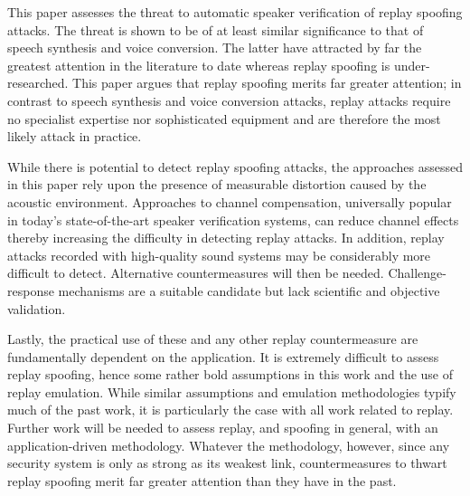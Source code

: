 
This paper assesses the threat to automatic speaker verification of replay spoofing attacks.  The threat is shown to be of at least similar significance to that of speech synthesis and voice conversion.  The latter have attracted by far the greatest attention in the literature to date whereas replay spoofing is under-researched.  This paper argues that replay spoofing merits far greater attention; in contrast to speech synthesis and voice conversion attacks, replay attacks require no specialist expertise nor sophisticated equipment and are therefore the most likely attack in practice.  

While there is potential to detect replay spoofing attacks, the approaches assessed in this paper rely upon the presence of measurable distortion caused by the acoustic environment.  Approaches to channel compensation, universally popular in today's state-of-the-art speaker verification systems, can reduce channel effects thereby increasing the difficulty in detecting replay attacks.  In addition, replay attacks recorded with high-quality sound systems may be considerably more difficult to detect.  Alternative countermeasures will then be needed.  Challenge-response mechanisms are a suitable candidate but lack scientific and objective validation.

Lastly, the practical use of these and any other replay countermeasure are fundamentally dependent on the application.  It is extremely difficult to assess replay spoofing, hence some rather bold assumptions in this work and the use of replay emulation.  While similar assumptions and emulation methodologies typify much of the past work, it is particularly the case with all work related to replay.  Further work will be needed to assess replay, and spoofing in general, with an application-driven methodology.  Whatever the methodology, however, since any security system is only as strong as its weakest link, countermeasures to thwart replay spoofing merit far greater attention than they have in the past.